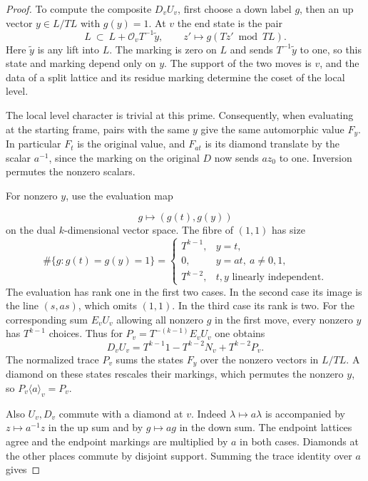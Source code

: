 \begin{proof}

To compute the composite \(D_v U_v\), first choose a down
label \(g\), then an up vector \(y\in L/TL\) with \(g(y)=1\).
At \(v\) the end state is the pair
\[
         L\ \subset\ L+\mathcal O_v T^{-1}\widetilde y,
                \qquad z'\longmapsto g(Tz'\bmod TL).
\]
Here \(\widetilde y\) is any lift into \(L\). The marking is
zero on \(L\) and sends \(T^{-1}\widetilde y\) to one, so
this state and marking depend only on \(y\). The support
of the two moves is \(v\), and the data of a split lattice
and its residue marking determine the coset of the local
level.

The local level character is trivial at this prime.
Consequently, when evaluating at the starting frame, pairs
with the same \(y\) give the same automorphic value
\(F_y\). In particular \(F_t\) is the original value, and
\(F_{a t}\) is its diamond translate by the scalar \(a^{-1}\),
since the marking on the original \(D\) now sends \(az_0\)
to one. Inversion permutes the nonzero scalars.

For nonzero \(y\), use the evaluation map

\[
  g\mapsto(g(t),g(y))
\]
 on the dual \(k\)-dimensional vector space.
The fibre of \((1,1)\) has size
\[
 \#\{g:g(t)=g(y)=1\}=
 \begin{cases}
 T^{k-1}, &y=t,\\
 0, &y=at,\ a\ne0,1,\\
 T^{k-2}, &t,y\text{ linearly independent}.
 \end{cases}
\]
The evaluation has rank one in the first two cases. In the second
case its image is the line \((s,as)\), which omits \((1,1)\).
In the third case its rank is two.
For the corresponding sum \(E_v U_v\) allowing all
nonzero \(g\) in the first move, every nonzero \(y\)
has \(T^{k-1}\) choices. Thus for \(P_v=T^{-(k-1)}E_vU_v\)
one obtains
\[
       D_v U_v=T^{k-1}1-T^{k-2}N_v+T^{k-2}P_v .
\]
The normalized trace \(P_v\) sums the states \(F_y\)
over the nonzero vectors in \(L/TL\). A diamond on
these states rescales their markings, which permutes
the nonzero \(y\), so \(P_v\langle a\rangle_v=P_v\).

Also \(U_v,D_v\) commute with a diamond at \(v\).
Indeed \(\lambda\mapsto a\lambda\) is accompanied by
\(z\mapsto a^{-1}z\) in the up sum and by \(g\mapsto ag\)
in the down sum. The endpoint lattices agree and the
endpoint markings are multiplied by \(a\) in both cases.
Diamonds at the other places commute by disjoint support.
Summing the trace identity over \(a\) gives


\end{proof}
